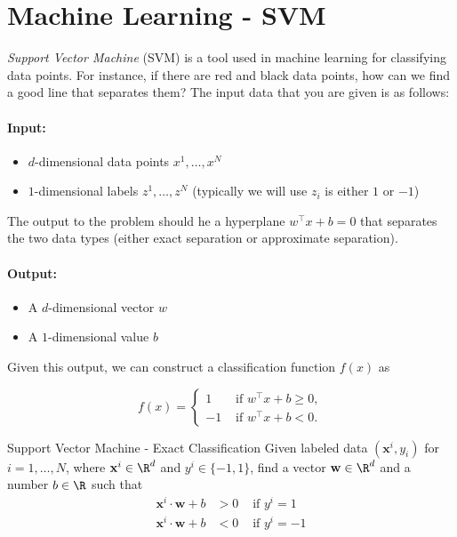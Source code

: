 \section{Machine Learning - SVM}



\emph{Support Vector Machine} (SVM) is a tool used in machine learning for classifying data points.   For instance, if there are red and black data points, how can we find a good line that separates them?  The input data that you are given is as follows:

\paragraph{Input:}
\begin{itemize}
\item $d$-dimensional data points $x^1, \dots, x^N$ 
\item $1$-dimensional labels $z^1, \dots, z^N$  (typically we will use $z_i$ is either $1$  or $-1$)
\end{itemize}

The output to the problem should he a hyperplane $w^\top x + b = 0$ that separates the two data types (either exact separation or approximate separation).

\paragraph{Output:}
\begin{itemize}
\item A $d$-dimensional vector $w$
\item A $1$-dimensional value $b$
\end{itemize}

Given this output, we can construct a classification function $f(x)$ as 

\begin{equation}
f(x) = \begin{cases}
1 & \text{ if } w^\top x + b \geq 0,\\
-1 & \text{ if } w^\top x + b < 0.
\end{cases}
\end{equation}


\begin{general}{Support Vector Machine - Exact Classification}{}
Given labeled data $(\mathbf{x}^i, y_i)$ for $i=1, \dots, N$, where $\mathbf{x}^i \in \R^d$ and $y^i \in \{-1,1\}$, find a vector $\mathbf{w} \in \R^d$ and a number $b \in \R$ such that 
\begin{align}
\mathbf{x}^i \cdot \mathbf{w} + b & > 0  & \text{ if } y^i = 1\\
\mathbf{x}^i \cdot \mathbf{w} + b & < 0  & \text{ if } y^i = -1
\end{align}
\end{general}


